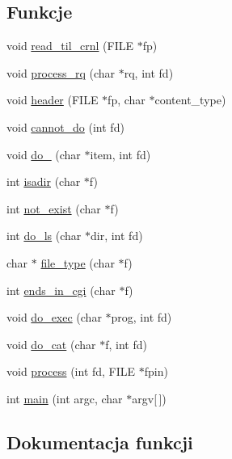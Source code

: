 \subsection*{Funkcje}
\begin{DoxyCompactItemize}
\item 
void \mbox{\hyperlink{10a-serwer_8c_aec3402ec3244a54e1bc086a1e1054755}{read\+\_\+til\+\_\+crnl}} (F\+I\+LE $\ast$fp)
\item 
void \mbox{\hyperlink{10a-serwer_8c_ad8ba6d5e4a00c2fff7a65af14096bd9b}{process\+\_\+rq}} (char $\ast$rq, int fd)
\item 
void \mbox{\hyperlink{10a-serwer_8c_adc7bfb1c892aecf61c0c73f3458caf90}{header}} (F\+I\+LE $\ast$fp, char $\ast$content\+\_\+type)
\item 
void \mbox{\hyperlink{10a-serwer_8c_a8e603d6f76a35b616135eb394f6ec080}{cannot\+\_\+do}} (int fd)
\item 
void \mbox{\hyperlink{10a-serwer_8c_ad3f91122750391e238cfbee3b88975ec}{do\+\_}} (char $\ast$item, int fd)
\item 
int \mbox{\hyperlink{10a-serwer_8c_a68ac50fc5196973b9f3ef7b4992f7279}{isadir}} (char $\ast$f)
\item 
int \mbox{\hyperlink{10a-serwer_8c_a963f754c08801de5f56c78f1b26e3a86}{not\+\_\+exist}} (char $\ast$f)
\item 
int \mbox{\hyperlink{10a-serwer_8c_a83999b0603c38aa5fe08f7ed801e6cfe}{do\+\_\+ls}} (char $\ast$dir, int fd)
\item 
char $\ast$ \mbox{\hyperlink{10a-serwer_8c_abc3ac0617e5de91d7a7989280030348e}{file\+\_\+type}} (char $\ast$f)
\item 
int \mbox{\hyperlink{10a-serwer_8c_ad3ef3c593d3a792b02a341450eaa62dd}{ends\+\_\+in\+\_\+cgi}} (char $\ast$f)
\item 
void \mbox{\hyperlink{10a-serwer_8c_a0a305ff573da158eaa9484e5506921c0}{do\+\_\+exec}} (char $\ast$prog, int fd)
\item 
void \mbox{\hyperlink{10a-serwer_8c_adab7e9f2617cceb5752ef3f97cfc2ef1}{do\+\_\+cat}} (char $\ast$f, int fd)
\item 
void \mbox{\hyperlink{10a-serwer_8c_a182f39efe710f6e9bf678baa9e8eafa3}{process}} (int fd, F\+I\+LE $\ast$fpin)
\item 
int \mbox{\hyperlink{10a-serwer_8c_a0ddf1224851353fc92bfbff6f499fa97}{main}} (int argc, char $\ast$argv\mbox{[}$\,$\mbox{]})
\end{DoxyCompactItemize}


\subsection{Dokumentacja funkcji}
\mbox{\label{10a-serwer_8c_a8e603d6f76a35b616135eb394f6ec080}} 
